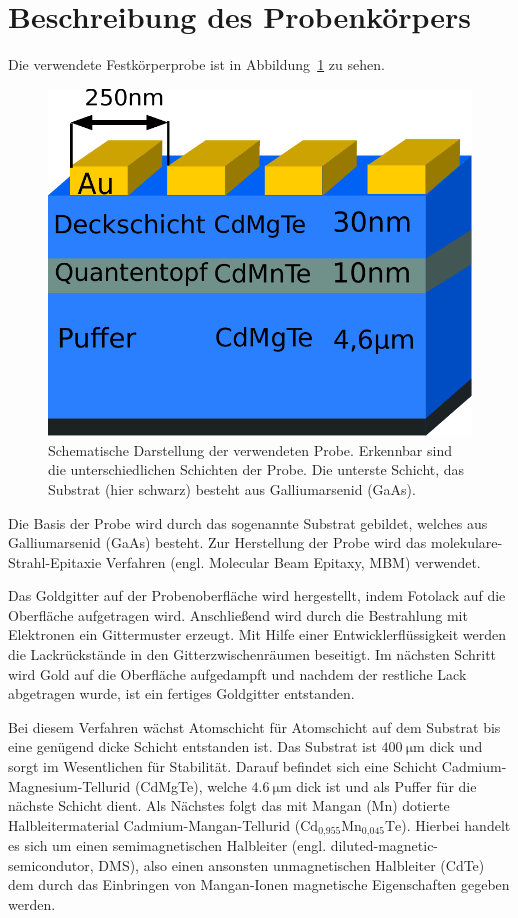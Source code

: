\section{Beschreibung des Probenkörpers}\label{sec:probe}
Die verwendete Festkörperprobe ist in Abbildung~\ref{fig:probe} zu sehen.
\begin{figure}
    \centering
    \includegraphics[scale=0.5]{./Plots/probe.pdf}
    \caption{Schematische Darstellung der verwendeten Probe. 
    Erkennbar sind die unterschiedlichen Schichten der Probe.
    Die unterste Schicht, das Substrat (hier schwarz) besteht aus Galliumarsenid (GaAs).}
    \label{fig:probe}
\end{figure}
\FloatBarrier

Die Basis der Probe wird durch das sogenannte Substrat gebildet, welches aus Galliumarsenid (GaAs) besteht.
Zur Herstellung der Probe wird das molekulare-Strahl-Epitaxie Verfahren (engl. Molecular Beam Epitaxy, MBM)
verwendet.

Das Goldgitter auf der Probenoberfläche wird hergestellt, indem Fotolack auf die Oberfläche aufgetragen wird.
Anschließend wird durch die Bestrahlung mit Elektronen ein Gittermuster erzeugt. 
Mit Hilfe einer Entwicklerflüssigkeit werden die Lackrückstände in den Gitterzwischenräumen beseitigt.
Im nächsten Schritt wird Gold auf die Oberfläche aufgedampft und nachdem der restliche Lack abgetragen
wurde, ist ein fertiges Goldgitter entstanden.

Bei diesem Verfahren wächst Atomschicht für Atomschicht auf dem Substrat bis eine genügend dicke Schicht entstanden ist.
Das Substrat ist $\SI{400}{\micro\meter}$ dick und sorgt im Wesentlichen für Stabilität.
Darauf befindet sich eine Schicht Cadmium-Magnesium-Tellurid (CdMgTe), welche $\SI{4,6}{\micro\meter}$ dick ist
und als Puffer für die nächste Schicht dient.
Als Nächstes folgt das mit Mangan (Mn) dotierte Halbleitermaterial Cadmium-Mangan-Tellurid
($\text{Cd}_\text{0,955}\text{Mn}_\text{0,045}\text{Te}$). 
Hierbei handelt es sich um einen semimagnetischen Halbleiter (engl. diluted-magnetic-semicondutor, DMS)\cite{allg_paper},
also einen ansonsten unmagnetischen Halbleiter (CdTe) dem durch das Einbringen 
von Mangan-Ionen magnetische Eigenschaften gegeben werden.

